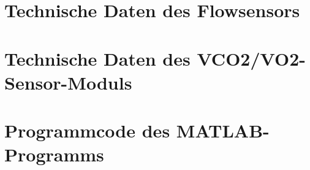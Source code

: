\chapter{Technische Daten des Flowsensors}


\chapter{Technische Daten des \gls{VCO2}/\gls{VO2}-Sensor-Moduls}


\chapter{Programmcode des MATLAB-Programms}



%